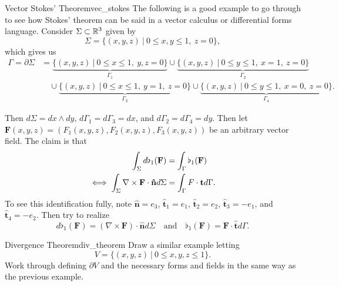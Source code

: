 \begin{ex}{Vector Stokes' Theorem}{vec_stokes}
    The following is a good example to go through to see how Stokes' theorem can be said in a vector calculus or differential forms language. Consider $\Sigma \subset \mathbb{R}^3$ given by
    \[
    \Sigma = \{(x,y,z)~\vert~ 0\leq x,y \leq 1, ~ z=0\},
    \]
    which gives us
    \begin{align*}
    \Gamma = \partial \Sigma &= \underbrace{\{(x,y,z)~\vert~0\leq x\leq  1, ~y,z=0\}}_{\Gamma_1} \cup \underbrace{\{(x,y,z)~\vert~0\leq y\leq  1, ~x=1,~z=0\}}_{\Gamma_2}\\
    &\quad \cup \underbrace{\{(x,y,z)~\vert~0\leq x\leq  1, ~y=1,~z=0\}}_{\Gamma_3} \cup \underbrace{\{(x,y,z)~\vert~0\leq y\leq  1, ~x=0,~z=0\}}_{\Gamma_4}.
    \end{align*}
    \begin{center}
        \end{center}
    
    Then $d\Sigma = dx\wedge dy$, $d\Gamma_1 = d\Gamma_3 = dx$, and $d\Gamma_2 = d\Gamma_4 = dy$. Then let $\mathbf{F}(x,y,z)=(F_1(x,y,z),F_2(x,y,z),F_3(x,y,z))$ be an arbitrary vector field. The claim is that
    \begin{align*}
        \int_\Sigma d\flat_1(\mathbf{F}) &= \int_\Gamma \flat_1(\mathbf{F})\\
        \iff \int_\Sigma \nabla \times \mathbf{F}\cdot \mathbf{\hat{n}}d\Sigma &= \int_\Gamma F\cdot \mathbf{t} d\Gamma.
    \end{align*}
    To see this identification fully, note $\mathbf{\hat{n}}=e_3$, $\mathbf{\hat{t}}_1=e_1$, $\mathbf{\hat{t}}_2=e_2$, $\mathbf{\hat{t}}_3=-e_1$, and $\mathbf{\hat{t}}_4=-e_2$. Then try to realize
    \[
    d\flat_1(\mathbf{F})=(\nabla \times \mathbf{F})\cdot \mathbf{\hat{n}}d\Sigma \quad \textrm{and} \quad \flat_1(\mathbf{F})=\mathbf{F}\cdot \mathbf{\hat{t}}d\Gamma.
    \]
\end{ex}

\begin{ex}{Divergence Theorem}{div_theorem}
    Draw a similar example letting 
    \[
    V = \{(x,y,z)~\vert~ 0\leq x,y,z\leq 1\}.
    \]
    Work through defining $\partial V$ and the necessary forms and fields in the same way as the previous example. 
\end{ex}

